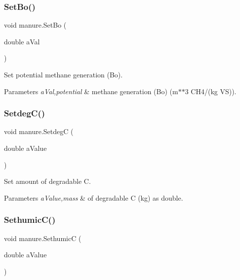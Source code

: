 \subsubsection{\texorpdfstring{SetBo()}{SetBo()}}
{\footnotesize\ttfamily void manure.\+Set\+Bo (\begin{DoxyParamCaption}\item[{double}]{a\+Val }\end{DoxyParamCaption})\hspace{0.3cm}{\ttfamily [inline]}}



Set potential methane generation (Bo). 


\begin{DoxyParams}{Parameters}
{\em a\+Val,potential} & methane generation (Bo) (m$\ast$$\ast$3 C\+H4/(kg VS)). \\
\hline
\end{DoxyParams}
\mbox{\label{classmanure_a7f8c8e1b3d430985b9601c42d208bee0}} 
\subsubsection{\texorpdfstring{SetdegC()}{SetdegC()}}
{\footnotesize\ttfamily void manure.\+SetdegC (\begin{DoxyParamCaption}\item[{double}]{a\+Value }\end{DoxyParamCaption})\hspace{0.3cm}{\ttfamily [inline]}}



Set amount of degradable C. 


\begin{DoxyParams}{Parameters}
{\em a\+Value,mass} & of degradable C (kg) as double. \\
\hline
\end{DoxyParams}
\mbox{\label{classmanure_aa95701a43cd8787d8a1574732e56098a}} 
\subsubsection{\texorpdfstring{SethumicC()}{SethumicC()}}
{\footnotesize\ttfamily void manure.\+SethumicC (\begin{DoxyParamCaption}\item[{double}]{a\+Value }\end{DoxyParamCaption})\hspace{0.3cm}{\ttfamily [inline]}}



